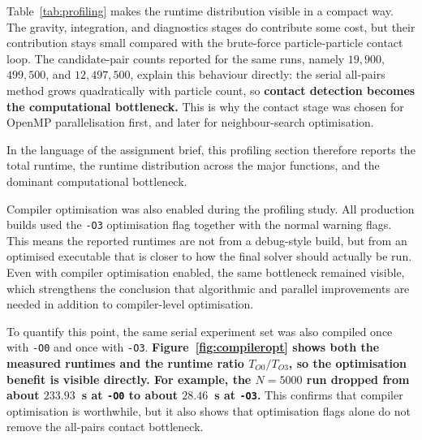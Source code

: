 \documentclass[conference]{IEEEtran}
\begin{document}
\begin{table}[t]
    \centering
    \scriptsize
    \caption{\textbf{Runtime distribution across major functions for the serial profiling runs.}}
    \label{tab:profiling}
    \setlength{\tabcolsep}{2pt}
\end{table}

Table~\ref{tab:profiling} makes the runtime distribution visible in a compact way. The gravity, integration, and diagnostics stages do contribute some cost, but their contribution stays small compared with the brute-force particle-particle contact loop. The candidate-pair counts reported for the same runs, namely $19{,}900$, $499{,}500$, and $12{,}497{,}500$, explain this behaviour directly: the serial all-pairs method grows quadratically with particle count, so \textbf{contact detection becomes the computational bottleneck.} This is why the contact stage was chosen for OpenMP parallelisation first, and later for neighbour-search optimisation.

In the language of the assignment brief, this profiling section therefore reports the total runtime, the runtime distribution across the major functions, and the dominant computational bottleneck.

Compiler optimisation was also enabled during the profiling study. All production builds used the \texttt{-O3} optimisation flag together with the normal warning flags. This means the reported runtimes are not from a debug-style build, but from an optimised executable that is closer to how the final solver should actually be run. Even with compiler optimisation enabled, the same bottleneck remained visible, which strengthens the conclusion that algorithmic and parallel improvements are needed in addition to compiler-level optimisation.

To quantify this point, the same serial experiment set was also compiled once with \texttt{-O0} and once with \texttt{-O3}. \textbf{Figure~\ref{fig:compileropt} shows both the measured runtimes and the runtime ratio $T_{O0}/T_{O3}$, so the optimisation benefit is visible directly. For example, the $N=5000$ run dropped from about $233.93$~s at \texttt{-O0} to about $28.46$~s at \texttt{-O3}.} This confirms that compiler optimisation is worthwhile, but it also shows that optimisation flags alone do not remove the all-pairs contact bottleneck.
\end{document}
